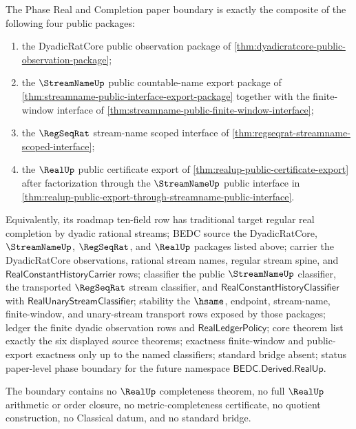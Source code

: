 \begin{theorem}
\label{thm:realup-phase-real-completion-boundary}
The Phase Real and Completion paper boundary is exactly the composite of the
following four public packages:
\begin{enumerate}
  \item the DyadicRatCore public observation package of
  \autoref{thm:dyadicratcore-public-observation-package};
  \item the $\StreamNameUp$ public countable-name export package of
  \autoref{thm:streamname-public-interface-export-package} together with the
  finite-window interface of
  \autoref{thm:streamname-public-finite-window-interface};
  \item the $\RegSeqRat$ stream-name scoped interface of
  \autoref{thm:regseqrat-streamname-scoped-interface};
  \item the $\RealUp$ public certificate export of
  \autoref{thm:realup-public-certificate-export} after factorization through
  the $\StreamNameUp$ public interface in
  \autoref{thm:realup-public-export-through-streamname-public-interface}.
\end{enumerate}
Equivalently, its roadmap ten-field row has traditional target regular real
completion by dyadic rational streams; BEDC source the DyadicRatCore,
$\StreamNameUp$, $\RegSeqRat$, and $\RealUp$ packages listed above; carrier the
DyadicRatCore observations, rational stream names, regular stream spine, and
$\mathsf{RealConstantHistoryCarrier}$ rows; classifier the public
$\StreamNameUp$ classifier, the transported $\RegSeqRat$ stream classifier, and
$\mathsf{RealConstantHistoryClassifier}$ with
$\mathsf{RealUnaryStreamClassifier}$; stability the $\hsame$, endpoint,
stream-name, finite-window, and unary-stream transport rows exposed by those
packages; ledger the finite dyadic observation rows and
$\mathsf{RealLedgerPolicy}$; core theorem list exactly the six displayed
source theorems; exactness finite-window and public-export exactness only up to
the named classifiers; standard bridge absent; status paper-level phase
boundary for the future namespace $\mathsf{BEDC.Derived.RealUp}$.

The boundary contains no $\RealUp$ completeness theorem, no full $\RealUp$
arithmetic or order closure, no metric-completeness certificate, no quotient
construction, no Classical datum, and no standard bridge.
\end{theorem}
